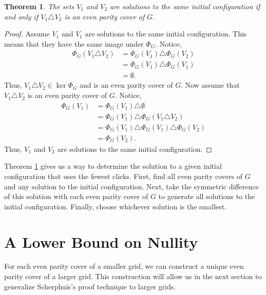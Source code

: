 \documentclass[a4paper]{article}
\newtheorem{theorem}{Theorem}[section]
\begin{document}
	\begin{theorem}\label{iff-even-parity}
		The sets $V_1$ and $V_2$ are solutions to the same initial configuration if and only if $V_1 \triangle V_2$ is an even parity cover of $G$.
	\end{theorem}
	\begin{proof}
		Assume $V_1$ and $V_1$ are solutions to the same initial configuration.
		This means that they have the same image under $\Phi_G$.
		Notice,
		\begin{align*}
			\Phi_G(V_1 \triangle V_2) &= \Phi_G(V_1) \triangle \Phi_G(V_2) \\
				&= \Phi_G(V_1) \triangle \Phi_G(V_1) \\
				&= \emptyset.
		\end{align*}
		Thus, $V_1 \triangle V_2 \in \ker{\Phi_G}$ and is an even parity cover of $G$.
		Now assume that $V_1 \triangle V_2$ is an even parity cover of $G$.
		Notice,
		\begin{align*}
			\Phi_G(V_1) &= \Phi_G(V_1) \triangle \emptyset \\
				&= \Phi_G(V_1) \triangle \Phi_G(V_1 \triangle V_2) \\
				&= \Phi_G(V_1) \triangle \Phi_G(V_1) \triangle \Phi_G(V_2) \\
				&= \Phi_G(V_2).
		\end{align*}
		Thus, $V_1$ and $V_2$ are solutions to the same initial configuration.
	\end{proof}

	Theorem \ref{iff-even-parity} gives us a way to determine the solution to a given initial configuration that uses the fewest clicks.
	First, find all even parity covers of $G$ and any solution to the initial configuration.
	Next, take the symmetric difference of this solution with each even parity cover of $G$ to generate all solutions to the initial configuration.
	Finally, choose whichever solution is the smallest.

	\section{A Lower Bound on Nullity}
	For each even parity cover of a smaller grid, we can construct a unique even parity cover of a larger grid.
	This construction will allow us in the next section to generalize Scherphuis's proof technique to larger grids.
	
\end{document}

